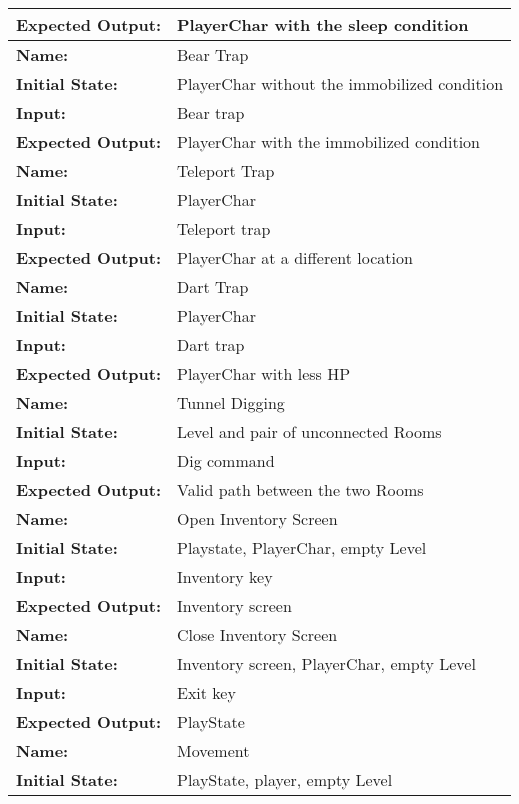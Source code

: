 \documentclass[12pt, titlepage]{article}
\begin{document}
\begin{center}
\begin{longtable}{ l | p{10cm} }
				\textbf{Expected Output:} & PlayerChar with the sleep condition\\[0.6em]
				\hline
				\rule{0pt}{1.5em}\textbf{Name:} & Bear Trap\\
				\textbf{Initial State:} & PlayerChar without the immobilized condition\\
				\textbf{Input:} & Bear trap\\
				\textbf{Expected Output:} & PlayerChar with the immobilized condition\\[0.6em]
				\hline
				\rule{0pt}{1.5em}\textbf{Name:} & Teleport Trap\\
				\textbf{Initial State:} & PlayerChar\\
				\textbf{Input:} & Teleport trap\\
				\textbf{Expected Output:} & PlayerChar at a different location\\[0.6em]
				\hline
				\rule{0pt}{1.5em}\textbf{Name:} & Dart Trap\\
				\textbf{Initial State:} & PlayerChar\\
				\textbf{Input:} & Dart trap\\
				\textbf{Expected Output:} & PlayerChar with less HP\\[0.6em]
				\hline
				\rule{0pt}{1.5em}\textbf{Name:} & Tunnel Digging\\
				\textbf{Initial State:} & Level and pair of unconnected Rooms\\
				\textbf{Input:} & Dig command\\
				\textbf{Expected Output:} & Valid path between the two Rooms\\[0.6em]
				\hline
				\rule{0pt}{1.5em}\textbf{Name:} & Open Inventory Screen\\
				\textbf{Initial State:} & Playstate, PlayerChar, empty Level\\
				\textbf{Input:} & Inventory key\\
				\textbf{Expected Output:} & Inventory screen\\[0.6em]
				\hline
				\rule{0pt}{1.5em}\textbf{Name:} & Close Inventory Screen\\
				\textbf{Initial State:} & Inventory screen, PlayerChar, empty Level\\
				\textbf{Input:} & Exit key\\
				\textbf{Expected Output:} & PlayState\\[0.6em]
				\hline
				\rule{0pt}{1.5em}\textbf{Name:} & Movement\\
				\textbf{Initial State:} & PlayState, player, empty Level\\

\end{longtable}
\end{center}
\end{document}
